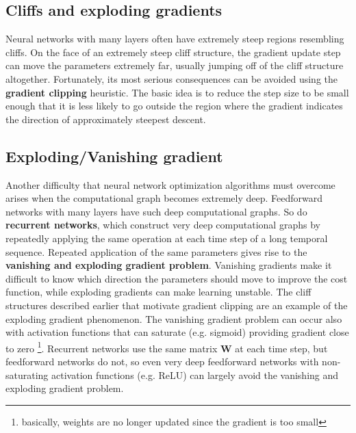 \subsection{Cliffs and exploding gradients}
Neural networks with many layers often have extremely steep regions resembling cliffs. On the face of an extremely steep cliff structure, the gradient update step can move the parameters extremely far, usually jumping off of the cliff structure altogether. Fortunately, its most serious consequences can be avoided using the \textbf{gradient clipping} heuristic. The basic idea is to reduce the step size to be small enough that it is less likely to go outside the region
where the gradient indicates the direction of approximately steepest descent.

\subsection{Exploding/Vanishing gradient}
Another difficulty that neural network optimization algorithms must overcome
arises when the computational graph becomes extremely deep. Feedforward
networks with many layers have such deep computational graphs. So do \textbf{recurrent networks}, which construct very deep computational graphs by repeatedly applying the same operation at each time step of a long temporal sequence. Repeated application of the same parameters gives rise to the \textbf{vanishing and exploding gradient problem}. Vanishing gradients make it difficult to know which direction the parameters should move to improve the cost function, while exploding gradients can make learning unstable. The cliff structures described earlier that motivate gradient clipping are an example of the exploding gradient phenomenon.\newline\newline
The vanishing gradient problem can occur also with activation functions that can saturate (e.g. sigmoid) providing gradient close to zero \footnote{basically, weights are no longer updated since the gradient is too small}.\newline\newline
Recurrent networks use the same matrix \textbf{W} at each time step, but feedforward networks do not, so even very deep feedforward networks with non-saturating activation functions (e.g. ReLU) can largely avoid the vanishing and exploding gradient problem.

